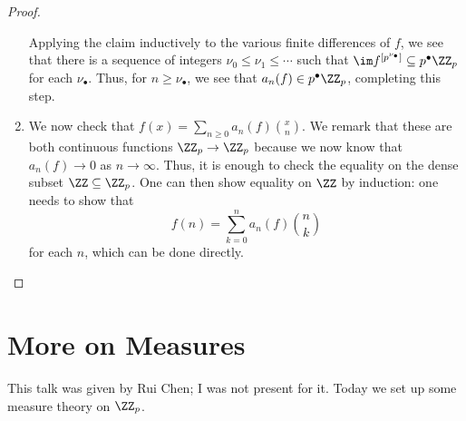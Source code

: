 \documentclass{article}
\begin{document}
\begin{proof}
\begin{enumerate}
		Applying the claim inductively to the various finite differences of $f$, we see that there is a sequence of integers $\nu_0\le\nu_1\le\cdots$ such that $\im f^{[p^{\nu_\bullet}]}\subseteq p^\bullet\ZZ_p$ for each $\nu_\bullet$. Thus, for $n\ge\nu_\bullet$, we see that $a_n(f)\in p^\bullet\ZZ_p$, completing this step.

		\item We now check that $f(x)=\sum_{n\ge0}a_n(f)\binom xn$. We remark that these are both continuous functions $\ZZ_p\to\ZZ_p$ because we now know that $a_n(f)\to0$ as $n\to\infty$. Thus, it is enough to check the equality on the dense subset $\ZZ\subseteq\ZZ_p$. One can then show equality on $\ZZ$ by induction: one needs to show that
		\[f(n)=\sum_{k=0}^na_n(f)\binom nk\]
		for each $n$, which can be done directly.
		\qedhere
	\end{enumerate}
\end{proof}

\section{More on Measures}
This talk was given by Rui Chen; I was not present for it. Today we set up some measure theory on $\ZZ_p$.
\end{document}
